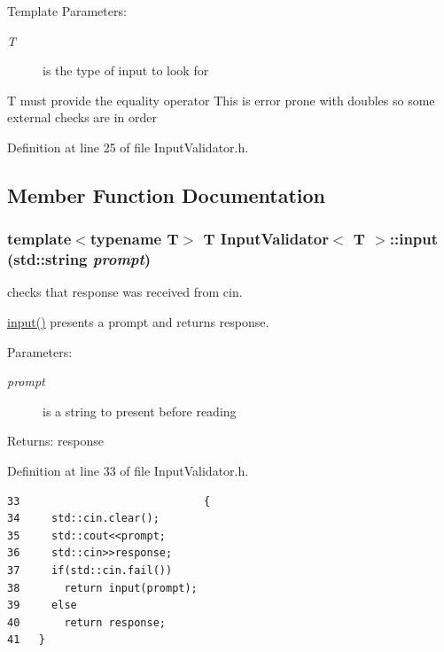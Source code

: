 \begin{Desc}
\item[Template Parameters:]
\begin{description}
\item[{\em T}]is the type of input to look for\end{description}
\end{Desc}
T must provide the equality operator This is error prone with doubles so some external checks are in order 

Definition at line 25 of file InputValidator.h.

\subsection{Member Function Documentation}
\hypertarget{classInputValidator_4d554feb8dc41f8990e62a34d2678574}{
\subsubsection[input]{\setlength{\rightskip}{0pt plus 5cm}template$<$typename T$>$ T {\bf InputValidator}$<$ T $>$::input (std::string {\em prompt})}}
\label{classInputValidator_4d554feb8dc41f8990e62a34d2678574}


checks that response was received from cin. 

\hyperlink{classInputValidator_4d554feb8dc41f8990e62a34d2678574}{input()} presents a prompt and returns response. \begin{Desc}
\item[Parameters:]
\begin{description}
\item[{\em prompt}]is a string to present before reading \end{description}
\end{Desc}
\begin{Desc}
\item[Returns:]response \end{Desc}


Definition at line 33 of file InputValidator.h.

\begin{Code}\begin{verbatim}33                             {
34     std::cin.clear();
35     std::cout<<prompt;
36     std::cin>>response;
37     if(std::cin.fail())
38       return input(prompt);
39     else
40       return response;
41   }
\end{verbatim}
\end{Code}




